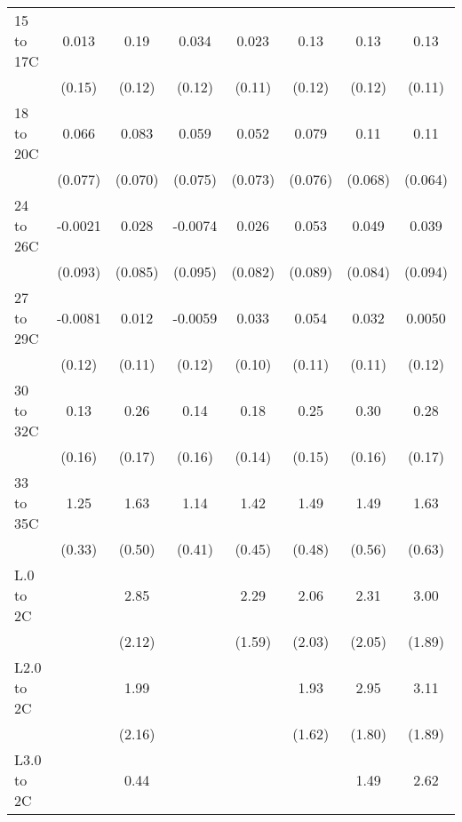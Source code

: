 \documentclass[paper=letterpaper, fontsize=11pt]{article} %
\begin{document}
{\begin{landscape}
\begin{longtable}{l*{7}{c}}
15 to 17C           &       0.013&        0.19&       0.034&       0.023&        0.13&        0.13&        0.13\\
                    &      (0.15)&      (0.12)&      (0.12)&      (0.11)&      (0.12)&      (0.12)&      (0.11)\\
18 to 20C           &       0.066&       0.083&       0.059&       0.052&       0.079&        0.11&        0.11\\
                    &     (0.077)&     (0.070)&     (0.075)&     (0.073)&     (0.076)&     (0.068)&     (0.064)\\
24 to 26C           &     -0.0021&       0.028&     -0.0074&       0.026&       0.053&       0.049&       0.039\\
                    &     (0.093)&     (0.085)&     (0.095)&     (0.082)&     (0.089)&     (0.084)&     (0.094)\\
27 to 29C           &     -0.0081&       0.012&     -0.0059&       0.033&       0.054&       0.032&      0.0050\\
                    &      (0.12)&      (0.11)&      (0.12)&      (0.10)&      (0.11)&      (0.11)&      (0.12)\\
30 to 32C           &        0.13&        0.26&        0.14&        0.18&        0.25&        0.30&        0.28\\
                    &      (0.16)&      (0.17)&      (0.16)&      (0.14)&      (0.15)&      (0.16)&      (0.17)\\
33 to 35C           &        1.25&        1.63&        1.14&        1.42&        1.49&        1.49&        1.63\\
                    &      (0.33)&      (0.50)&      (0.41)&      (0.45)&      (0.48)&      (0.56)&      (0.63)\\
L.0 to 2C           &            &        2.85&            &        2.29&        2.06&        2.31&        3.00\\
                    &            &      (2.12)&            &      (1.59)&      (2.03)&      (2.05)&      (1.89)\\
L2.0 to 2C          &            &        1.99&            &            &        1.93&        2.95&        3.11\\
                    &            &      (2.16)&            &            &      (1.62)&      (1.80)&      (1.89)\\
L3.0 to 2C          &            &        0.44&            &            &            &        1.49&        2.62\\

\end{longtable}
\end{landscape}}
\end{document}
